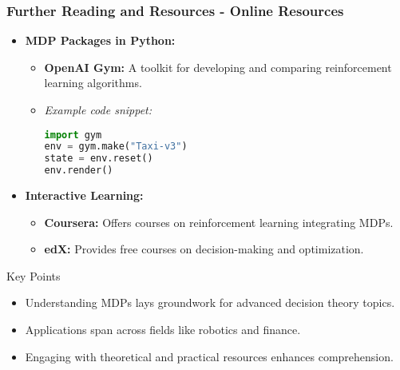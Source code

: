 \documentclass[aspectratio=169]{beamer}
\begin{document}
\begin{frame}[fragile]
    \frametitle{Further Reading and Resources - Online Resources}
    
    \begin{itemize}
        \item \textbf{MDP Packages in Python:}
        \begin{itemize}
            \item \textbf{OpenAI Gym:} A toolkit for developing and comparing reinforcement learning algorithms.
            \item \textit{Example code snippet:}
            \begin{lstlisting}[language=Python]
import gym
env = gym.make("Taxi-v3")
state = env.reset()
env.render()
            \end{lstlisting}
        \end{itemize}
        
        \item \textbf{Interactive Learning:}
        \begin{itemize}
            \item \textbf{Coursera:} Offers courses on reinforcement learning integrating MDPs.
            \item \textbf{edX:} Provides free courses on decision-making and optimization.
        \end{itemize}
    \end{itemize}

    \begin{block}{Key Points}
        \begin{itemize}
            \item Understanding MDPs lays groundwork for advanced decision theory topics.
            \item Applications span across fields like robotics and finance.
            \item Engaging with theoretical and practical resources enhances comprehension.
        \end{itemize}
    \end{block}
\end{frame}
\end{document}

